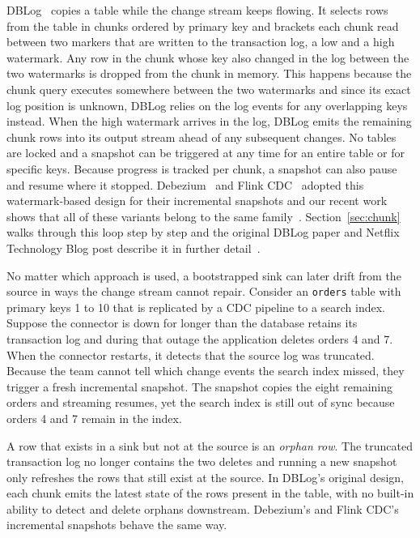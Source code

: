 \documentclass[sigconf,nonacm,10pt]{acmart}
\begin{document}
DBLog~\cite{andreakis2020dblog} copies a table while the change stream keeps
flowing. It selects rows from the table in chunks ordered by primary key
and brackets each chunk read between two markers that are written to the transaction log,
a low and a high watermark. Any row in the chunk whose key also changed in the
log between the two watermarks is dropped from the chunk in memory. This happens
because the chunk query executes somewhere between the two watermarks and since
its exact log position is unknown, DBLog relies on the log events for any
overlapping keys instead. When the high watermark
arrives in the log, DBLog emits the remaining chunk rows into its output stream ahead
of any subsequent changes. No tables are locked and a snapshot can be triggered
at any time for an entire table or for specific keys. Because progress is
tracked per chunk, a snapshot can also pause and resume where it stopped.
Debezium~\cite{debezium_16_final,debezium_incremental_snapshots} and Flink
CDC~\cite{flinkcdc_mysql} adopted this watermark-based design for their
incremental snapshots and our recent work shows that all of these
variants belong to the same family~\cite{andreakis2026generalized}. Section~\ref{sec:chunk}
walks through this loop step by step and the original DBLog paper and Netflix
Technology Blog post describe it in further detail~\cite{andreakis2020dblog,dblog_netflix_blog}.

No matter which approach is used, a bootstrapped sink can later drift from the source in
ways the change stream cannot repair. Consider an \texttt{orders} table with
primary keys 1 to 10 that is replicated by a CDC pipeline to a search index.
Suppose the connector is down for longer than the database retains its
transaction log and during that outage the application deletes orders 4 and 7.
When the connector restarts, it detects that the source log was truncated.
Because the team cannot tell which change events the search index missed, they
trigger a fresh incremental snapshot. The snapshot copies the eight remaining
orders and streaming resumes, yet the search index is still out of sync
because orders 4 and 7 remain in the index.

A row that exists in a sink but not at the source is an \emph{orphan row}. The truncated transaction log no longer contains the two
deletes and running a new snapshot only refreshes the rows that still exist at
the source. In DBLog's original design, each chunk emits the latest state of the
rows present in the table, with no built-in ability to detect and delete orphans downstream. 
Debezium's and Flink CDC's incremental snapshots behave the same way.
\end{document}
